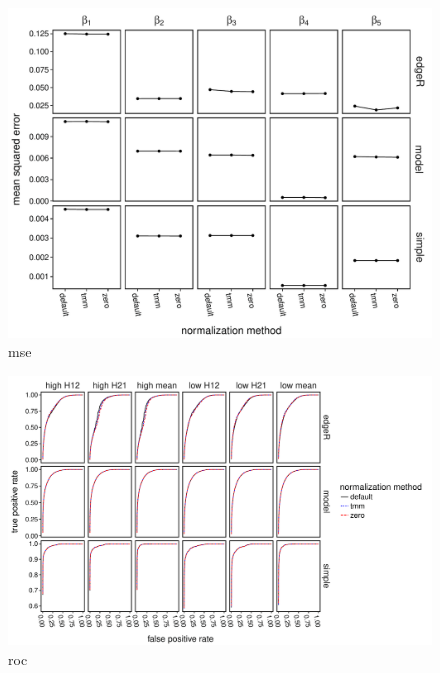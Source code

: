 \documentclass{article}
\begin{document}
\begin{flushleft}

\begin{figure}[htbp]
   \centering
   \includegraphics[scale=0.5]{mse}
   \caption{mse}
   \label{fig:mse}
\end{figure}

\begin{figure}[htbp]
   \centering
   \includegraphics[scale=0.5]{roc}
   \caption{roc}
   \label{fig:roc}
\end{figure}


\end{flushleft}
\end{document}
